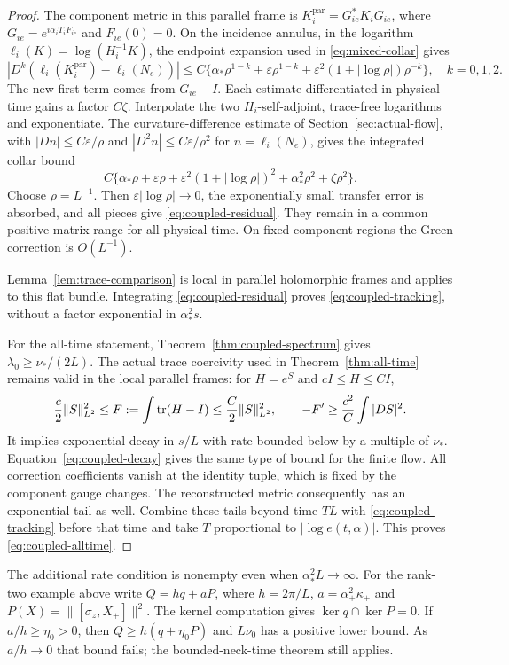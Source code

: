 \begin{proof}
The component metric in this parallel
frame is $K_i^{\mathrm{par}}=G_{ie}^*K_iG_{ie}$,
where $G_{ie}=e^{i\alpha_iT_iF_{ie}}$ and
$F_{ie}(0)=0$. On the incidence annulus,
in the logarithm $\ell_i(K)=\log(H_i^{-1}K)$,
the endpoint expansion used in
\eqref{eq:mixed-collar} gives
\[
 |D^k(\ell_i(K_i^{\mathrm{par}})-\ell_i(N_e))|
 \le C\{\alpha_*\rho^{1-k}
       +\varepsilon\rho^{1-k}
       +\varepsilon^2(1+|\log\rho|)\rho^{-k}\},
 \quad k=0,1,2.
\]
The new first term comes from $G_{ie}-I$.
Each estimate differentiated in physical
time gains a factor $C\zeta$.
Interpolate the two $H_i$-self-adjoint,
trace-free logarithms and exponentiate.
The curvature-difference estimate of
Section~\ref{sec:actual-flow}, with
$|Dn|\le C\varepsilon/\rho$ and
$|D^2n|\le C\varepsilon/\rho^2$ for
$n=\ell_i(N_e)$, gives the integrated
collar bound
\[
 C\{\alpha_*\rho+\varepsilon\rho
       +\varepsilon^2(1+|\log\rho|)^2
       +\alpha_*^2\rho^2+\zeta\rho^2\}.
\]
Choose $\rho=L^{-1}$.
Then $\varepsilon|\log\rho|\to0$,
the exponentially small transfer error
is absorbed, and all pieces give
\eqref{eq:coupled-residual}.
They remain in a common positive matrix
range for all physical time.
On fixed component regions the Green
correction is $O(L^{-1})$.

Lemma~\ref{lem:trace-comparison} is local
in parallel holomorphic frames and
applies to this flat bundle. Integrating
\eqref{eq:coupled-residual} proves
\eqref{eq:coupled-tracking}, without a
factor exponential in $\alpha_*^2s$.

For the all-time statement,
Theorem~\ref{thm:coupled-spectrum} gives
$\lambda_0\ge\nu_*/(2L)$.
The actual trace coercivity used in
Theorem~\ref{thm:all-time} remains valid
in the local parallel frames:
for $H=e^S$ and $cI\le H\le CI$,
\[
 \frac c2\|S\|_{L^2}^2
 \le F:=\int\operatorname{tr}(H-I)\le\frac C2\|S\|_{L^2}^2,
 \qquad -F'\ge\frac{c^2}{C}\int|DS|^2 .
\]
It implies exponential decay in $s/L$
with rate bounded below by a multiple
of $\nu_*$. Equation~\eqref{eq:coupled-decay}
gives the same type of bound for the
finite flow. All correction coefficients
vanish at the identity tuple, which is
fixed by the component gauge changes.
The reconstructed metric consequently
has an exponential tail as well.
Combine these tails beyond time $TL$
with \eqref{eq:coupled-tracking} before
that time and take $T$ proportional to
$|\log e(t,\alpha)|$. This proves
\eqref{eq:coupled-alltime}.
\end{proof}

The additional rate condition is nonempty
even when $\alpha_*^2L\to\infty$.
For the rank-two example above write
$Q=hq+aP$, where $h=2\pi/L$,
$a=\alpha_+^2\kappa_+$ and
$P(X)=\|[\sigma_z,X_+]\|^2$.
The kernel computation gives
$\ker q\cap\ker P=0$.
If $a/h\ge\eta_0>0$, then
$Q\ge h(q+\eta_0P)$ and $L\nu_0$
has a positive lower bound.
As $a/h\to0$ that bound fails; the
bounded-neck-time theorem still applies.


